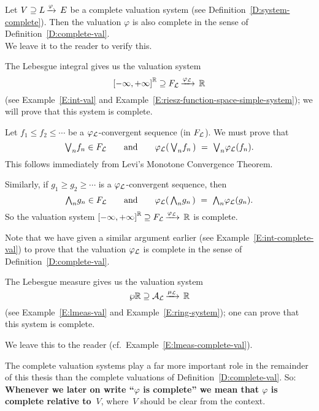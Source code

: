 %
%
\begin{rem}
Let $V \supseteq L\,\smash{\xrightarrow{\varphi}\,E}$ be a complete valuation
system
(see Definition~\ref{D:system-complete}).
Then the valuation $\varphi$
is also complete in the sense
of Definition~\ref{D:complete-val}.\\
We leave it to the reader to verify this.
\end{rem}
%
%
\begin{ex}
\label{E:complete-lint}
The Lebesgue integral
gives us the   valuation system
\begin{equation*}
{[-\infty,+\infty]}^{\mathbb{R}} \supseteq F_{\mathcal{L}}\,\smash{\xrightarrow{\varphi_{\mathcal{L}}}\,\mathbb{R}}
\end{equation*}
(see Example~\ref{E:int-val} and
Example~\ref{E:riesz-function-space-simple-system});
we will prove that this system is complete.

Let $f_1 \leq f_2 \leq \dotsb$
be a $\varphi_{\mathcal{L}}$-convergent sequence (in $F_{\mathcal{L}}$).
We must prove that 
\begin{equation*}
\textstyle{\bigvee}_n f_n \in F_{\mathcal{L}}
\qquad\text{and}\qquad\varphi_{\mathcal{L}}(\,\textstyle{\bigvee}_n f_n\,) \ =\  \textstyle{\bigvee}_n \varphi_{\mathcal{L}} (f_n).
\end{equation*}
This follows immediately from Levi's Monotone Convergence Theorem.

Similarly,
if $g_1 \geq g_2 \geq \dotsb$
is a $\varphi_{\mathcal{L}}$-convergent sequence,
then
\begin{equation*}
\textstyle{\bigwedge}_n g_n \in F_{\mathcal{L}}
\qquad\text{and}\qquad\varphi_{\mathcal{L}}(\,\textstyle{\bigwedge}_n g_n\,) \ =\  \textstyle{\bigwedge}_n \varphi_{\mathcal{L}} (g_n).
\end{equation*}
So the  valuation system ${[-\infty,+\infty]}^{\mathbb{R}} \supseteq F_{\mathcal{L}}\,\smash{\xrightarrow{\varphi_{\mathcal{L}}}\,\mathbb{R}}$ is complete.

Note that we have given a similar argument earlier 
(see Example~\ref{E:int-complete-val}) to prove
that the valuation $\varphi_{\mathcal{L}}$
is complete in the sense of Definition~\ref{D:complete-val}.
\end{ex}
%
%
\begin{ex}
\label{E:complete-lmeas}
The Lebesgue measure
gives us the   valuation system
\begin{equation*}
\wp{\mathbb{R}} \supseteq \mathcal{A}_{\mathcal{L}}\,\smash{\xrightarrow{\mu_{\mathcal{L}}}\,\mathbb{R}}
\end{equation*}
(see Example~\ref{E:lmeas-val} and
Example~\ref{E:ring-system});
one can prove that this system is complete.

We leave this to the reader (cf.~Example~\ref{E:lmeas-complete-val}).
\end{ex}
%
%
%
\begin{cnv}
The complete valuation systems play a far more important
role in the remainder of this thesis
than the complete valuations of Definition~\ref{D:complete-val}.
So:\\
\textbf{Whenever we later on write ``$\varphi$ is complete'' 
we mean that  $\varphi$ is complete relative to~$V$},
where~$V$ should be clear from the context.
\end{cnv}














